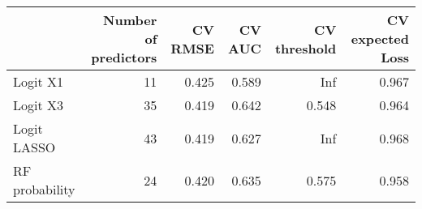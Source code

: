 
\begin{tabular}{lrrrrr}
\toprule
  & Number of predictors & CV RMSE & CV AUC & CV threshold & CV expected Loss\\
\midrule
Logit X1 & 11 & 0.425 & 0.589 & Inf & 0.967\\
Logit X3 & 35 & 0.419 & 0.642 & 0.548 & 0.964\\
Logit LASSO & 43 & 0.419 & 0.627 & Inf & 0.968\\
RF probability & 24 & 0.420 & 0.635 & 0.575 & 0.958\\
\bottomrule
\end{tabular}
